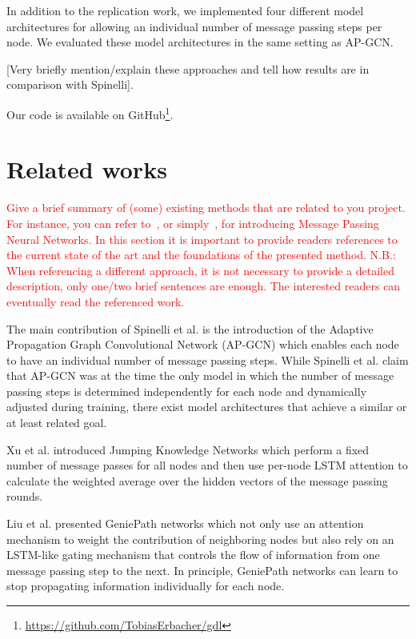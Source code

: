 \documentclass{gdl}
\begin{document}
In addition to the replication work, we implemented four different model architectures for allowing an individual number of message passing steps per node. We evaluated these model architectures in the same setting as AP-GCN.

[Very briefly mention/explain these approaches and tell how results are in comparison with Spinelli]. 

Our code is available on GitHub\footnote{\url{https://github.com/TobiasErbacher/gdl}}.

\section{Related works}

\textcolor{red}{Give a brief summary of (some) existing methods that are related to you project. For instance, you can refer to~\citet{gilmer2017neural}, or simply~\cite{gilmer2017neural}, for introducing Message Passing Neural Networks. In this section it is important to provide readers references to the current state of the art and the foundations of the presented method. 
N.B.: When referencing a different approach, it is not necessary to provide a detailed description, only one/two brief sentences are enough. The interested readers can eventually read the referenced work. }


The main contribution of Spinelli et al. is the introduction of the Adaptive Propagation Graph Convolutional Network (AP-GCN) which enables each node to have an individual number of message passing steps. While Spinelli et al. claim that AP-GCN was at the time the only model in which the number of message passing steps is determined independently for each node and dynamically adjusted during training, there exist model architectures that achieve a similar or at least related goal.

Xu et al. \cite{xu2018} introduced Jumping Knowledge Networks which perform a fixed number of message passes for all nodes and then use per-node LSTM attention to calculate the weighted average over the hidden vectors of the message passing rounds.   

Liu et al. \cite{liu2019} presented GeniePath networks which not only use an attention mechanism to weight the contribution of neighboring nodes but also rely on an LSTM-like gating mechanism that controls the flow of information from one message passing step to the next. In principle, GeniePath networks can learn to stop propagating information individually for each node.
\end{document}

